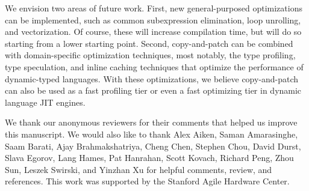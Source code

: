 \documentclass[acmsmall,nonacm,screen]{acmart}\settopmatter{printfolios=true,printccs=true,printacmref=false}
\newcommand{\cp}{copy-and-patch}
\begin{document}
We envision two areas of future work. First, new general-purposed optimizations can be implemented, such as common subexpression elimination, loop unrolling, and vectorization. Of course, these will increase compilation time, but will do so starting from a lower starting point. Second, \cp{} can be combined with domain-specific optimization techniques, most notably, the type profiling, type speculation, and inline caching techniques that optimize the performance of dynamic-typed languages. With these optimizations, we believe \cp{} can also be used as a fast profiling tier or even a fast optimizing tier in dynamic language JIT engines.

\begin{acks}
We thank our anonymous reviewers for their comments that helped us improve this manuscript. We would also like to thank
Alex Aiken,
Saman Amarasinghe,
Saam Barati, 
Ajay Brahmakshatriya,  
Cheng Chen,
Stephen Chou,
David Durst,
Slava Egorov,
Lang Hames,
Pat Hanrahan,
Scott Kovach,
Richard Peng,
Zhou Sun, 
Leszek Swirski, and
Yinzhan Xu
for helpful comments, review, and references. This work was supported by the Stanford Agile Hardware Center.
\end{acks}


\end{document}
